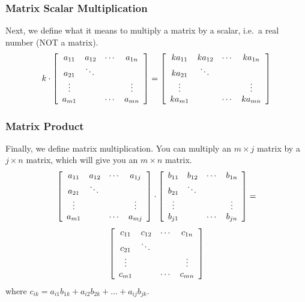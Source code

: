 \documentclass[xcolor=dvipsnames]{beamer}
\begin{document}
\begin{frame}
  \frametitle{Matrix Scalar Multiplication}
Next, we define what it means to multiply a matrix by a scalar, i.e.\
a real number (NOT a matrix). 
\begin{equation}
  \label{eq:theishie}
  k\cdot\left[\begin{array}{cccc}
    a_{11}&a_{12}&\cdots{}&a_{1n} \\
          a_{21}&\ddots{}&& \\
          \vdots{}&&&\vdots \\
          a_{m1}&&\cdots{}&a_{mn}
  \end{array}\right]=\left[\begin{array}{cccc}
    ka_{11}&ka_{12}&\cdots{}&ka_{1n} \\
          ka_{21}&\ddots{}&& \\
          \vdots{}&&&\vdots \\
          ka_{m1}&&\cdots{}&ka_{mn}
  \end{array}\right]\notag
\end{equation}
\end{frame}

\begin{frame}
  \frametitle{Matrix Product}
Finally, we define matrix multiplication. You can multiply an
$m\times{}j$ matrix by a $j\times{}n$ matrix, which will give you an
$m\times{}n$ matrix.
\begin{equation}
  \label{eq:orahpahn}
  \left[\begin{array}{cccc}
    a_{11}&a_{12}&\cdots{}&a_{1j} \\
          a_{21}&\ddots{}&& \\
          \vdots{}&&&\vdots \\
          a_{m1}&&\cdots{}&a_{mj}
  \end{array}\right]\cdot
\left[\begin{array}{cccc}
    b_{11}&b_{12}&\cdots{}&b_{1n} \\
          b_{21}&\ddots{}&& \\
          \vdots{}&&&\vdots \\
          b_{j1}&&\cdots{}&b_{jn}
  \end{array}\right]=\notag
\end{equation}
\begin{equation}
  \label{eq:raipuboi}
  \left[\begin{array}{cccc}
    c_{11}&c_{12}&\cdots{}&c_{1n} \\
          c_{21}&\ddots{}&& \\
          \vdots{}&&&\vdots \\
          c_{m1}&&\cdots{}&c_{mn}
  \end{array}\right]\notag
\end{equation}
where $c_{ik}=a_{i1}b_{1k}+a_{i2}b_{2k}+\ldots+a_{ij}b_{jk}$.
\end{frame}
\end{document}
